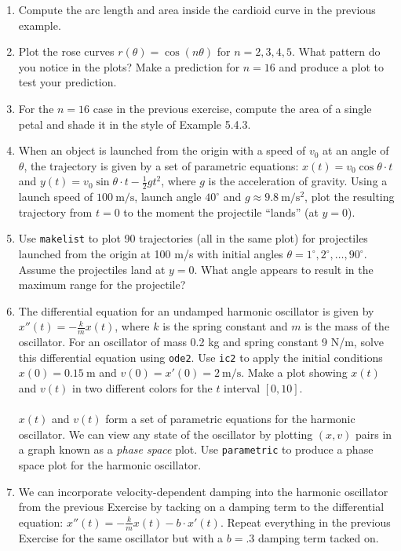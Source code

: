 \documentclass[10.5pt,twoside]{report}
\theoremstyle{definition}
\begin{document}
\begin{enumerate}
\item  Compute the arc length and area inside the cardioid curve in the previous example.

\item  Plot the rose curves $r(\theta)=\cos{(n\theta)}$ for $n=2,3,4,5$.  What pattern do you notice in the plots?  Make a prediction for $n=16$ and produce a plot to test your prediction.

\item For the $n=16$ case in the previous exercise, compute the area of a single petal and shade it in the style of Example 5.4.3.

\item  When an object is launched from the origin with a speed of $v_0$ at an angle of $\theta$, the trajectory is given by a set of parametric equations:  $x(t)=v_0 \cos{\theta}\cdot t$ and $y(t)=v_0 \sin{\theta}\cdot t - \frac{1}{2} gt^2$, where $g$ is the acceleration of gravity.  Using a launch speed of $100\ \mathrm{m/s}$, launch angle $40^{\circ}$ and $g\approx 9.8\ \mathrm{m/s^2}$, plot the resulting trajectory from $t=0$ to the moment the projectile ``lands'' (at $y=0$).

\item  Use \verb|makelist| to plot 90 trajectories (all in the same plot) for projectiles launched from the origin at 100 m/s with initial angles $\theta = 1^{\circ}, 2^{\circ},\dots ,90^{\circ}$.  Assume the projectiles land at $y=0$.  What angle appears to result in the maximum range for the projectile?  

\item  The differential equation for an undamped harmonic oscillator is given by $x''(t)=-\frac{k}{m} x(t)$, where $k$ is the spring constant and $m$ is the mass of the oscillator.  For an oscillator of mass 0.2 kg and spring constant 9 N/m, solve this differential equation using \verb|ode2|.  Use \verb|ic2| to apply the initial conditions $x(0)=0.15\ \mathrm{m}$ and $v(0)=x'(0)=2\ \mathrm{m/s}$.  Make a plot showing $x(t)$ and $v(t)$ in two different colors for the $t$ interval $[0,10]$. \\
${}$\\
$x(t)$ and $v(t)$ form a set of parametric equations for the harmonic oscillator.  We can view any state of the oscillator by plotting $(x,v)$ pairs in a graph known as a \textit{phase space} plot.  Use \verb|parametric| to produce a phase space plot for the harmonic oscillator.

\item  We can incorporate velocity-dependent damping into the harmonic oscillator from the previous Exercise by tacking on a damping term to the differential equation:  $x''(t)=-\frac{k}{m} x(t)-b\cdot x'(t)$.  Repeat everything in the previous Exercise for the same oscillator but with a $b=.3$ damping term tacked on.


\end{enumerate}
\end{document}
